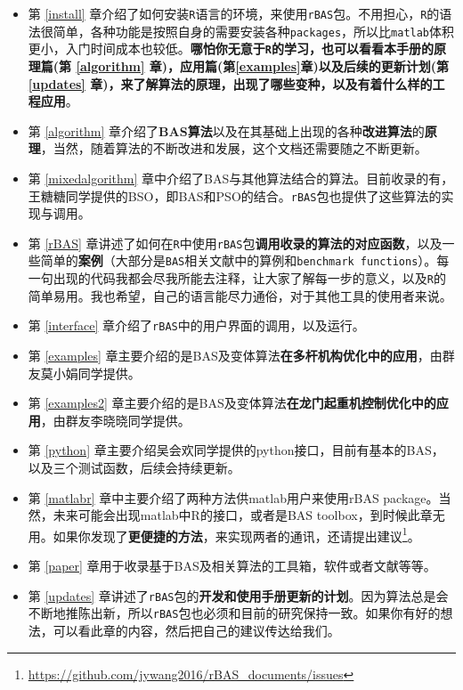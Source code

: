 \documentclass[]{ctexbook}
\renewcommand{\href}[2]{#2\footnote{\url{#1}}}
\begin{document}
\begin{itemize}
\item
  第 \ref{install}
  章介绍了如何安装\texttt{R}语言的环境，来使用\texttt{rBAS}包。不用担心，\texttt{R}的语法很简单，各种功能是按照自身的需要安装各种\texttt{packages}，所以比\texttt{matlab}体积更小，入门时间成本也较低。\textbf{哪怕你无意于\texttt{R}的学习，也可以看看本手册的原理篇(第
  \ref{algorithm} 章)，应用篇(第\ref{examples}章)以及后续的更新计划(第
  \ref{updates}
  章)，来了解算法的原理，出现了哪些变种，以及有着什么样的工程应用}。
\item
  第 \ref{algorithm}
  章介绍了\textbf{BAS算法}以及在其基础上出现的各种\textbf{改进算法}的\textbf{原理}，当然，随着算法的不断改进和发展，这个文档还需要随之不断更新。
\item
  第 \ref{mixedalgorithm}
  章中介绍了BAS与其他算法结合的算法。目前收录的有，王糖糖同学提供的BSO，即BAS和PSO的结合。\texttt{rBAS}包也提供了这些算法的实现与调用。
\item
  第 \ref{rBAS}
  章讲述了如何在\texttt{R}中使用\texttt{rBAS}包\textbf{调用收录的算法的对应函数}，以及一些简单的\textbf{案例}（大部分是\texttt{BAS}相关文献中的算例和\texttt{benchmark\ functions}）。每一句出现的代码我都会尽我所能去注释，让大家了解每一步的意义，以及\texttt{R}的简单易用。我也希望，自己的语言能尽力通俗，对于其他工具的使用者来说。
\item
  第 \ref{interface} 章介绍了\texttt{rBAS}中的用户界面的调用，以及运行。
\item
  第 \ref{examples}
  章主要介绍的是BAS及变体算法\textbf{在多杆机构优化中的应用}，由群友莫小娟同学提供。
\item
  第 \ref{examples2}
  章主要介绍的是BAS及变体算法\textbf{在龙门起重机控制优化中的应用}，由群友李晓晓同学提供。
\item
  第 \ref{python}
  章主要介绍吴会欢同学提供的python接口，目前有基本的BAS，以及三个测试函数，后续会持续更新。
\item
  第 \ref{matlabr} 章中主要介绍了两种方法供matlab用户来使用rBAS
  package。当然，未来可能会出现matlab中R的接口，或者是BAS
  toolbox，到时候此章无用。如果你发现了\textbf{更便捷的方法}，来实现两者的通讯，还请\href{https://github.com/jywang2016/rBAS_documents/issues}{提出建议}。
\item
  第 \ref{paper} 章用于收录基于BAS及相关算法的工具箱，软件或者文献等等。
\item
  第 \ref{updates}
  章讲述了\texttt{rBAS}包的\textbf{开发和使用手册更新的计划}。因为算法总是会不断地推陈出新，所以\texttt{rBAS}包也必须和目前的研究保持一致。如果你有好的想法，可以看此章的内容，然后把自己的建议传达给我们。
\end{itemize}
\end{document}
